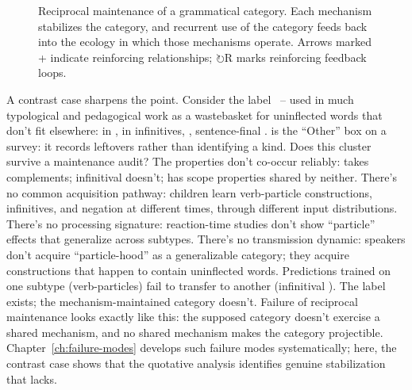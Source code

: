 \begin{figure}[htbp]
\caption{Reciprocal maintenance of a grammatical category. Each mechanism stabilizes the category, and recurrent use of the category feeds back into the ecology in which those mechanisms operate. Arrows marked + indicate reinforcing relationships; $\circlearrowright$R marks reinforcing feedback loops.}
\label{fig:causal-loop}
\end{figure}

A contrast case sharpens the point. Consider the label ~-- used in much typological and pedagogical work as a wastebasket for uninflected words that don't fit elsewhere:  in ,  in infinitives, , sentence-final .  is the \enquote{Other} box on a survey: it records leftovers rather than identifying a kind. Does this cluster survive a maintenance audit? The properties don't co-occur reliably:  takes complements; infinitival  doesn't;  has scope properties shared by neither. There's no common acquisition pathway: children learn verb-particle constructions, infinitives, and negation at different times, through different input distributions. There's no processing signature: reaction-time studies don't show \enquote{particle} effects that generalize across subtypes. There's no transmission dynamic: speakers don't acquire \enquote{particle-hood} as a generalizable category; they acquire constructions that happen to contain uninflected words. Predictions trained on one subtype (verb-particles) fail to transfer to another (infinitival ). The label exists; the mechanism-maintained category doesn't. Failure of reciprocal maintenance looks exactly like this: the supposed category doesn't exercise a shared mechanism, and no shared mechanism makes the category projectible. Chapter~\ref{ch:failure-modes} develops such failure modes systematically; here, the contrast case shows that the quotative analysis identifies genuine stabilization that  lacks.

